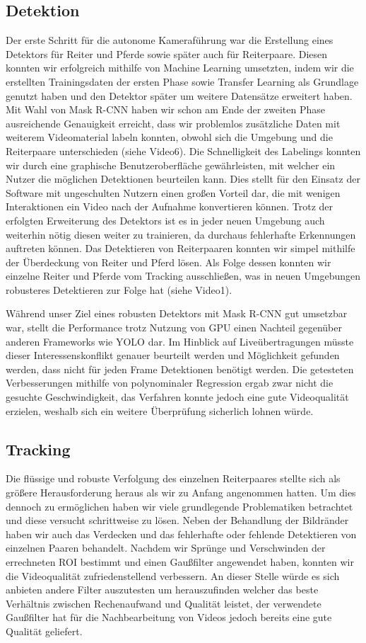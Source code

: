 \subsection*{Detektion}
Der erste Schritt für die autonome Kameraführung war die Erstellung eines Detektors für Reiter und Pferde sowie später auch für Reiterpaare. Diesen konnten wir erfolgreich mithilfe von Machine Learning umsetzten, indem wir die erstellten Trainingsdaten der ersten Phase sowie Transfer Learning als Grundlage genutzt haben und den Detektor später um weitere Datensätze erweitert haben. Mit Wahl von Mask R-CNN haben wir schon am Ende der zweiten Phase ausreichende Genauigkeit erreicht, dass wir problemlos zusätzliche Daten mit weiterem Videomaterial labeln konnten, obwohl sich die Umgebung und die Reiterpaare unterschieden (siehe Video6). Die Schnelligkeit des Labelings konnten wir durch eine graphische Benutzeroberfläche gewährleisten, mit welcher ein Nutzer die möglichen Detektionen  beurteilen kann. Dies stellt für den Einsatz der Software mit ungeschulten Nutzern einen großen Vorteil dar, die mit wenigen Interaktionen ein Video nach der Aufnahme konvertieren können. Trotz der erfolgten Erweiterung des Detektors ist es in jeder neuen Umgebung auch weiterhin nötig diesen weiter zu trainieren, da durchaus fehlerhafte Erkennungen auftreten können.
Das Detektieren von Reiterpaaren konnten wir simpel mithilfe der Überdeckung von Reiter und Pferd lösen. Als Folge dessen konnten wir einzelne Reiter und Pferde vom Tracking ausschließen, was in neuen Umgebungen robusteres Detektieren zur Folge hat (siehe Video1).

Während unser Ziel eines robusten Detektors mit Mask R-CNN gut umsetzbar war, stellt die Performance trotz Nutzung von GPU einen Nachteil gegenüber anderen Frameworks wie YOLO dar. Im Hinblick auf Liveübertragungen müsste dieser Interessenskonflikt genauer beurteilt werden und Möglichkeit gefunden werden, dass nicht für jeden Frame Detektionen benötigt werden. Die getesteten Verbesserungen mithilfe von polynominaler Regression ergab zwar nicht die gesuchte Geschwindigkeit, das Verfahren konnte jedoch eine gute Videoqualität erzielen, weshalb sich ein weitere Überprüfung sicherlich lohnen würde.


\subsection*{Tracking}
Die flüssige und robuste Verfolgung des einzelnen Reiterpaares stellte sich als größere Herausforderung heraus als wir zu Anfang angenommen hatten. Um dies dennoch zu ermöglichen haben wir viele grundlegende Problematiken betrachtet und diese versucht schrittweise zu lösen. 
Neben der Behandlung der Bildränder haben wir auch das Verdecken und das fehlerhafte oder fehlende Detektieren von einzelnen Paaren behandelt. Nachdem wir Sprünge und Verschwinden der errechneten ROI bestimmt und einen Gaußfilter angewendet haben, konnten wir die Videoqualität zufriedenstellend verbessern. An dieser Stelle würde es sich anbieten andere Filter auszutesten um herauszufinden welcher das beste Verhältnis zwischen Rechenaufwand und Qualität leistet, der verwendete Gaußfilter hat für die Nachbearbeitung von Videos jedoch bereits eine gute Qualität geliefert.

